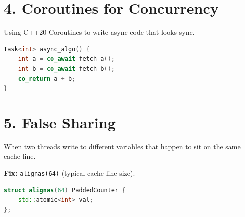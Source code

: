 \hypertarget{coroutines-for-concurrency}{%
\section{4. Coroutines for
Concurrency}\label{coroutines-for-concurrency}}

Using C++20 Coroutines to write async code that looks sync.

\begin{lstlisting}[language={C++}]
Task<int> async_algo() {
    int a = co_await fetch_a();
    int b = co_await fetch_b();
    co_return a + b;
}
\end{lstlisting}

\hypertarget{false-sharing}{%
\section{5. False Sharing}\label{false-sharing}}

When two threads write to different variables that happen to sit on the
same cache line.

\textbf{Fix:} \passthrough{\lstinline!alignas(64)!} (typical cache line
size).

\begin{lstlisting}[language={C++}]
struct alignas(64) PaddedCounter {
    std::atomic<int> val;
};
\end{lstlisting}
